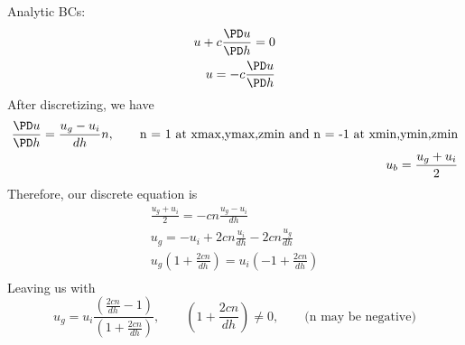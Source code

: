 \documentclass[11pt]{article}
\begin{document}
Analytic BCs:
\begin{equation}\begin{aligned}
	u + c \frac{\PD u}{\PD h} = 0 \\
	u =-c \frac{\PD u}{\PD h} \\
\end{aligned}\end{equation}
After discretizing, we have
\begin{equation}\begin{aligned}
	\frac{\PD u}{\PD h} = \frac{u_g - u_i}{dh} n, \qquad \text{n = 1 at xmax,ymax,zmin and n = -1 at xmin,ymin,zmin} \\
	u_b = \frac{u_g+u_i}{2} \\
\end{aligned}\end{equation}
Therefore, our discrete equation is
\begin{equation}\begin{aligned}
	\frac{u_g+u_i}{2} = -cn \frac{u_g - u_i}{dh} \\
	u_g = -u_i + 2cn \frac{u_i}{dh} - 2cn \frac{u_g}{dh} \\
	u_g \left( 1 + \frac{2 cn}{dh} \right) = u_i \left( -1 + \frac{2cn}{dh} \right) \\
\end{aligned}\end{equation}
Leaving us with
\begin{equation}
	\boxed{
	u_g = u_i \frac{\left(\frac{2cn}{dh} - 1 \right)}{\left(1 + \frac{2cn}{dh} \right)},
	\qquad \left(1 + \frac{2cn}{dh} \right) \ne 0, \qquad \text{(n may be negative)}
	}
\end{equation}
\end{document}
